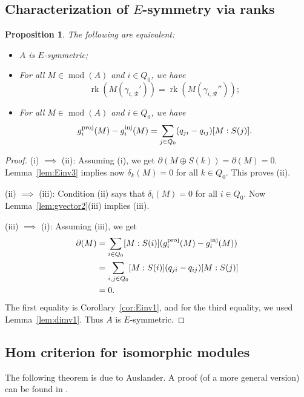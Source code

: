 \documentclass[12pt,reqno]{amsart}
\newtheorem{Prop}[Thm]{Proposition}
\theoremstyle{definition}
\newcommand{\cR}{{\mathcal R}}
\newcommand{\rk}{\operatorname{rk}}
\newcommand{\md}{\operatorname{mod}}
\begin{document}
\subsection{Characterization of $E$-symmetry via ranks}

\begin{Prop}\label{prop:EsymmRank}
The following are equivalent:
\begin{itemize}\itemsep2mm

\item[(i)]
$A$ is $E$-symmetric;

\item[(ii)]
For all $M \in \md(A)$ and $i \in Q_0$, we have
$$
\rk(M(\gamma_{i,\cR}')) = \rk(M(\gamma_{i,\cR}''));
$$

\item[(iii)]
For all $M \in \md(A)$ and $i \in Q_0$, we have
$$
g_i^{\rm proj}(M) - g_i^{\rm inj}(M)
= \sum_{j \in Q_0} (q_{ji} - q_{ij})[M:S(j)].
$$

\end{itemize}
\end{Prop}

\begin{proof}
(i) $\implies$ (ii):
Assuming (i), we get $\partial(M \oplus S(k)) = \partial(M) = 0$.
Lemma~\ref{lem:Einv3} implies now $\delta_k(M) = 0$ for all
$k \in Q_0$.
This proves (ii).


(ii) $\implies$ (iii):
Condition (ii) says that $\delta_i(M) = 0$ for all $i \in Q_0$.
Now Lemma~\ref{lem:gvector2}(iii) implies (iii).


(iii) $\implies$ (i):
Assuming (iii), we get
\begin{align*}
\partial(M) &= \sum_{i \in Q_0} [M:S(i)] 
(g_i^{\rm proj}(M) - g_i^{\rm inj}(M))
\\
&= \sum_{i,j \in Q_0} [M:S(i)](q_{ji} - q_{ij})[M:S(j)]
\\
&= 0.
\end{align*}
The first equality is Corollary~\ref{cor:Einv1}, and
for the third equality, we used Lemma~\ref{lem:dimv1}.
Thus $A$ is $E$-symmetric.
\end{proof}

\subsection{Hom criterion for isomorphic modules}
The following theorem is due to Auslander. A proof 
(of a more general version) can be found in \cite{B89}.
\end{document}

